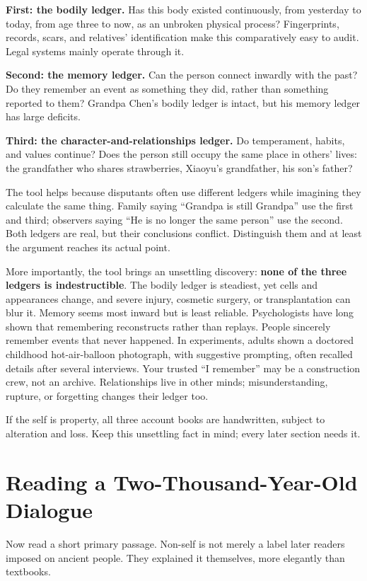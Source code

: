 \textbf{First: the bodily ledger.} Has this body existed continuously, from yesterday to today, from age three to now, as an unbroken physical process? Fingerprints, records, scars, and relatives' identification make this comparatively easy to audit. Legal systems mainly operate through it.

\textbf{Second: the memory ledger.} Can the person connect inwardly with the past? Do they remember an event as something they did, rather than something reported to them? Grandpa Chen's bodily ledger is intact, but his memory ledger has large deficits.

\textbf{Third: the character-and-relationships ledger.} Do temperament, habits, and values continue? Does the person still occupy the same place in others' lives: the grandfather who shares strawberries, Xiaoyu's grandfather, his son's father?

The tool helps because disputants often use different ledgers while imagining they calculate the same thing. Family saying ``Grandpa is still Grandpa'' use the first and third; observers saying ``He is no longer the same person'' use the second. Both ledgers are real, but their conclusions conflict. Distinguish them and at least the argument reaches its actual point.

More importantly, the tool brings an unsettling discovery: \textbf{none of the three ledgers is indestructible}. The bodily ledger is steadiest, yet cells and appearances change, and severe injury, cosmetic surgery, or transplantation can blur it. Memory seems most inward but is least reliable. Psychologists have long shown that remembering reconstructs rather than replays. People sincerely remember events that never happened. In experiments, adults shown a doctored childhood hot-air-balloon photograph, with suggestive prompting, often recalled details after several interviews. Your trusted ``I remember'' may be a construction crew, not an archive. Relationships live in other minds; misunderstanding, rupture, or forgetting changes their ledger too.

If the self is property, all three account books are handwritten, subject to alteration and loss. Keep this unsettling fact in mind; every later section needs it.

\section{Reading a Two-Thousand-Year-Old Dialogue}
Now read a short primary passage. Non-self is not merely a label later readers imposed on ancient people. They explained it themselves, more elegantly than textbooks.

